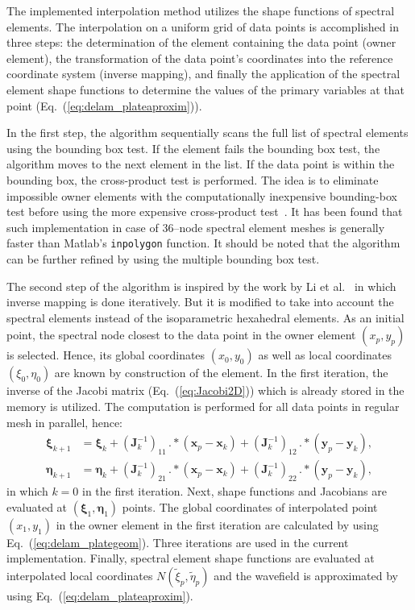 \documentclass[preprint,12pt]{elsarticle}
\renewcommand{\vec}[1]{\mathbf{#1}}
\newcommand{\bs}[1]{\boldsymbol{#1}}
\begin{document}
	The implemented interpolation method utilizes the shape functions of spectral elements. The interpolation on a uniform grid of data points is accomplished in three steps: the determination of the element containing the data point (owner element), the transformation of the data point’s coordinates into the reference coordinate system (inverse mapping), and finally the application of the spectral element shape functions to determine the values of the primary variables at that point (Eq.~(\ref{eq:delam_plateaproxim})).
	
	In the first step, the algorithm sequentially scans the full list of spectral elements using the bounding box test. If the element fails the bounding box test, the algorithm moves to the next element in the list. If the data point is within the bounding box, the cross-product test is performed. The idea is to eliminate impossible owner elements with the computationally inexpensive bounding-box test before using the more expensive cross-product test~\cite{Silva2009}. It has been found that such implementation in case of 36--node spectral element meshes is generally faster than Matlab's \verb|inpolygon| function. It should be noted that the algorithm can be further refined by using the multiple bounding box test.
	
	The second step of the algorithm is inspired by the work by Li et al.~\cite{Li2014} in which inverse mapping is done iteratively. But it is modified to take into account the spectral elements instead of the isoparametric hexahedral elements. As an initial point, the spectral node closest to the data point in the owner element $(x_p, y_p)$ is selected. Hence, its global coordinates $(x_0, y_0)$ as well as local coordinates $(\xi_0,\eta_0)$  are known by construction of the element. In the first iteration, the inverse of the Jacobi matrix (Eq.~(\ref{eq:Jacobi2D})) which is already stored in the memory is utilized. The computation is performed for all data points in regular mesh in parallel, hence: 
	\begin{equation}
	\begin{split}
	\bs{\xi}_{k+1}&=\bs{\xi}_k + \left(\vec{J}^{-1}_{k}\right)_{11}\,.*\left(\vec{x}_p-\vec{x}_k\right) +  \left(\vec{J}^{-1}_{k}\right)_{12}\,.*\left(\vec{y}_p-\vec{y}_k\right), \\
	\bs{\eta}_{k+1}&=\bs{\eta}_k + \left(\vec{J}^{-1}_{k}\right)_{21}\,.*\left(\vec{x}_p-\vec{x}_k\right) +  \left(\vec{J}^{-1}_{k}\right)_{22}\,.*\left(\vec{y}_p-\vec{y}_k\right),
	\end{split}
	\label{eq:interp_initial}
	\end{equation} 
	in which $k=0$ in the first iteration.
	Next, shape functions and Jacobians are evaluated at $(\bs{\xi}_{1}, \bs{\eta}_{1})$ points. The global coordinates of interpolated point $(x_1,y_1)$ in the owner element in the first iteration are calculated by using Eq.~(\ref{eq:delam_plategeom}). Three iterations are used in the current implementation. Finally, spectral element shape functions are evaluated at interpolated local coordinates $N(\tilde{\xi}_p,\tilde{\eta}_p)$ and the wavefield is approximated by using Eq.~(\ref{eq:delam_plateaproxim}).
	
\end{document}
